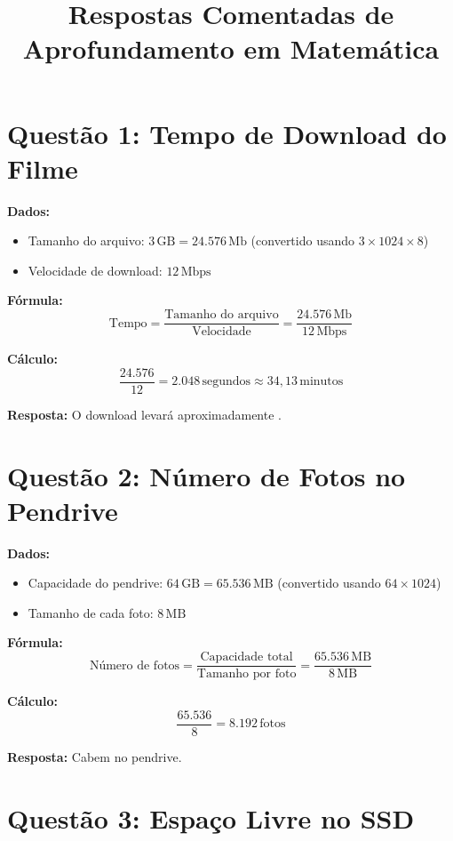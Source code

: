 \documentclass{article}
\title{Respostas Comentadas de Aprofundamento em Matemática}
\author{}
\date{}
\begin{document}
\maketitle

\section*{Questão 1: Tempo de Download do Filme}

\textbf{Dados:}
\begin{itemize}
    \item Tamanho do arquivo: $3\,\text{GB} = 24.576\,\text{Mb}$ (convertido usando $3 \times 1024 \times 8$)
    \item Velocidade de download: $12\,\text{Mbps}$
\end{itemize}

\textbf{Fórmula:}
\[
\text{Tempo} = \frac{\text{Tamanho do arquivo}}{\text{Velocidade}} = \frac{24.576\,\text{Mb}}{12\,\text{Mbps}}
\]

\textbf{Cálculo:}
\[
\frac{24.576}{12} = 2.048\,\text{segundos} \approx 34,13\,\text{minutos}
\]

\textbf{Resposta:} O download levará aproximadamente .

\section*{Questão 2: Número de Fotos no Pendrive}

\textbf{Dados:}
\begin{itemize}
    \item Capacidade do pendrive: $64\,\text{GB} = 65.536\,\text{MB}$ (convertido usando $64 \times 1024$)
    \item Tamanho de cada foto: $8\,\text{MB}$
\end{itemize}

\textbf{Fórmula:}
\[
\text{Número de fotos} = \frac{\text{Capacidade total}}{\text{Tamanho por foto}} = \frac{65.536\,\text{MB}}{8\,\text{MB}}
\]

\textbf{Cálculo:}
\[
\frac{65.536}{8} = 8.192\,\text{fotos}
\]

\textbf{Resposta:} Cabem  no pendrive.

\section*{Questão 3: Espaço Livre no SSD}
\end{document}
